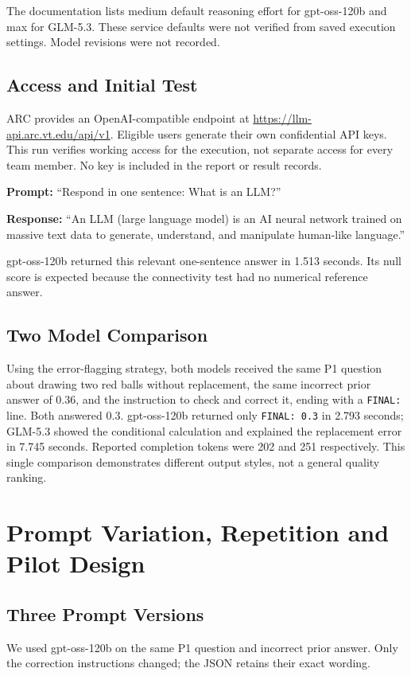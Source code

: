 \documentclass[11pt,letterpaper]{article}
\begin{document}
The documentation lists medium default reasoning effort for gpt-oss-120b and max for GLM-5.3. These service defaults were not verified from saved execution settings. Model revisions were not recorded.

\subsection*{Access and Initial Test}
ARC provides an OpenAI-compatible endpoint at \url{https://llm-api.arc.vt.edu/api/v1}. Eligible users generate their own confidential API keys. This run verifies working access for the execution, not separate access for every team member. No key is included in the report or result records.

\textbf{Prompt:} ``Respond in one sentence: What is an LLM?''

\textbf{Response:} ``An LLM (large language model) is an AI neural network trained on massive text data to generate, understand, and manipulate human-like language.''

gpt-oss-120b returned this relevant one-sentence answer in 1.513 seconds. Its null score is expected because the connectivity test had no numerical reference answer.

\subsection*{Two Model Comparison}
Using the error-flagging strategy, both models received the same P1 question about drawing two red balls without replacement, the same incorrect prior answer of 0.36, and the instruction to check and correct it, ending with a \texttt{FINAL:} line. Both answered 0.3. gpt-oss-120b returned only \texttt{FINAL: 0.3} in 2.793 seconds; GLM-5.3 showed the conditional calculation and explained the replacement error in 7.745 seconds. Reported completion tokens were 202 and 251 respectively. This single comparison demonstrates different output styles, not a general quality ranking.

\clearpage
\section{Prompt Variation, Repetition and Pilot Design}
\subsection*{Three Prompt Versions}
We used gpt-oss-120b on the same P1 question and incorrect prior answer. Only the correction instructions changed; the JSON retains their exact wording.
\end{document}
